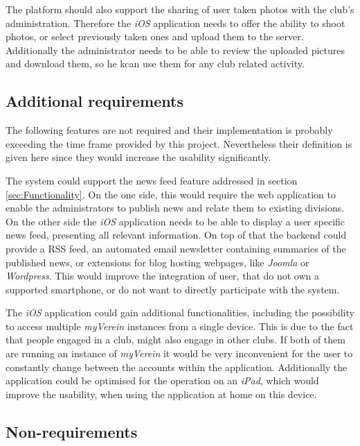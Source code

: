 The platform should also support the sharing of user taken photos with the club's administration. Therefore the \emph{iOS} application needs to offer the ability to shoot photos, or select previously taken ones and upload them to the server. Additionally the administrator needs to be able to review the uploaded pictures and download them, so he kcan use them for any club related activity.

\subsection{Additional requirements}
\label{sec:AdditionalReq}

The following features are not required and their implementation is probably exceeding the time frame provided by this project. Nevertheless their definition is given here since they would increase the usability significantly. 

The system could support the news feed feature addressed in section \vref{sec:Functionality}. On the one side, this would require the web application to enable the administrators to publish news and relate them to existing divisions. On the other side the \emph{iOS} application needs to be able to display a user specific news feed, presenting all relevant information. On top of that the backend could provide a \gls{RSS} feed, an automated email newsletter containing summaries of the published news, or extensions for blog hosting webpages, like \emph{Joomla} or \emph{Wordpress}. This would improve the integration of user, that do not own a supported smartphone, or do not want to directly participate with the system.

The \emph{iOS} application could gain additional functionalities, including the possibility to access multiple \emph{myVerein} instances from a single device. This is due to the fact that people engaged in a club, might also engage in other clubs. If both of them are running an instance of \emph{myVerein} it would be very inconvenient for the user to constantly change between the accounts within the application. Additionally the application could be optimised for the operation on an \emph{iPad}, which would improve the usability, when using the application at home on this device.

\subsection{Non-requirements} %

